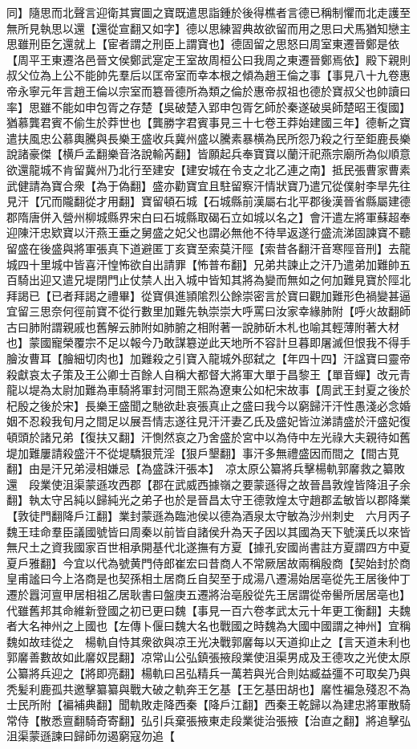 同】隨思而北聲言迎衛其實圖之寶既遣思詣鍾於後得樵者言德已稱制懼而北走護至無所見執思以還【還從宣翻又如字】德以思練習典故欲留而用之思曰犬馬猶知戀主思雖刑臣乞還就上【宦者謂之刑臣上謂寶也】德固留之思怒曰周室東遷晉鄭是依【周平王東遷洛邑晉文侯鄭武寔定王室故周桓公曰我周之東遷晉鄭焉依】殿下親則叔父位為上公不能帥先羣后以匡帝室而幸本根之傾為趙王倫之事【事見八十九卷惠帝永寧元年言趙王倫以宗室而簒晉德所為類之倫於惠帝叔祖也德於寶叔父也帥讀曰率】思雖不能如申包胥之存楚【吳破楚入郢申包胥乞師於秦遂破吳師楚昭王復國】猶慕龔君賓不偷生於莽世也【龔勝字君賓事見三十七卷王莽始建國三年】德斬之寶遣扶風忠公慕輿騰與長樂王盛收兵冀州盛以騰素暴横為民所怨乃殺之行至鉅鹿長樂說諸豪傑【横戶孟翻樂音洛說輸芮翻】皆願起兵奉寶寶以蘭汗祀燕宗廟所為似順意欲還龍城不肯留冀州乃北行至建安【建安城在令支之北乙連之南】抵民張曹家曹素武健請為寶合衆【為于偽翻】盛亦勸寶宜且駐留察汗情狀寶乃遣冗從僕射李旱先往見汗【冗而隴翻從才用翻】寶留頓石城【石城縣前漢屬右北平郡後漢晉省縣屬建德郡隋唐併入營州柳城縣界宋白曰石城縣取碣石立如城以名之】會汗遣左將軍蘇超奉迎陳汗忠欵寶以汗燕王垂之舅盛之妃父也謂必無他不待旱返遂行盛流涕固諫寶不聽留盛在後盛與將軍張真下道避匿丁亥寶至索莫汗陘【索昔各翻汗音寒陘音刑】去龍城四十里城中皆喜汗惶怖欲自出請罪【怖普布翻】兄弟共諫止之汗乃遣弟加難帥五百騎出迎又遣兄堤閉門止仗禁人出入城中皆知其將為變而無如之何加難見寶於陘北拜謁已【已者拜謁之禮畢】從寶俱進頴隂烈公餘崇密言於寶曰觀加難形色禍變甚逼宜留三思奈何徑前寶不從行數里加難先執崇崇大呼罵曰汝家幸緣肺附【呼火故翻師古曰肺附謂親戚也舊解云肺附如肺腑之相附著一說肺斫木札也喻其輕薄附著大材也】蒙國寵榮覆宗不足以報今乃敢謀簒逆此天地所不容計旦暮即屠滅但恨我不得手膾汝曹耳【膾細切肉也】加難殺之引寶入龍城外邸弑之【年四十四】汗諡寶曰靈帝殺獻哀太子策及王公卿士百餘人自稱大都督大將軍大單于昌黎王【單音蟬】改元青龍以堤為太尉加難為車騎將軍封河間王熙為遼東公如杞宋故事【周武王封夏之後於杞殷之後於宋】長樂王盛聞之馳欲赴哀張真止之盛曰我今以窮歸汗汗性愚淺必念婚姻不忍殺我旬月之間足以展吾情志遂往見汗汗妻乙氏及盛妃皆泣涕請盛於汗盛妃復頓頭於諸兄弟【復扶又翻】汗惻然哀之乃舍盛於宮中以為侍中左光祿大夫親待如舊堤加難屢請殺盛汗不從堤驕狠荒淫【狠戶墾翻】事汗多無禮盛因而間之【間古莧翻】由是汗兄弟浸相嫌忌【為盛誅汗張本】　凉太原公纂將兵擊楊軌郭黁救之纂敗還　段業使沮渠蒙遜攻西郡【郡在武威西據嶺之要蒙遜得之故晉昌敦煌皆降沮子余翻】執太守呂純以歸純光之弟子也於是晉昌太守王德敦煌太守趙郡孟敏皆以郡降業【敦徒門翻降戶江翻】業封蒙遜為臨池侯以德為酒泉太守敏為沙州刺史　六月丙子魏王珪命羣臣議國號皆曰周秦以前皆自諸侯升為天子因以其國為天下號漢氏以來皆無尺土之資我國家百世相承開基代北遂撫有方夏【據孔安國尚書註方夏謂四方中夏夏戶雅翻】今宜以代為號黄門侍郎崔宏曰昔商人不常厥居故兩稱殷商【契始封於商皇甫謐曰今上洛商是也契孫相土居商丘自契至于成湯八遷湯始居亳從先王居後仲丁遷於囂河亶甲居相祖乙居耿書曰盤庚五遷將治亳殷從先王居謂從帝嚳所居居亳也】代雖舊邦其命維新登國之初已更曰魏【事見一百六卷孝武太元十年更工衡翻】夫魏者大名神州之上國也【左傳卜偃曰魏大名也戰國之時魏為大國中國謂之神州】宜稱魏如故珪從之　楊軌自恃其衆欲與凉王光决戰郭黁每以天道抑止之【言天道未利也郭黁善數故如此黁奴昆翻】凉常山公弘鎮張掖段業使沮渠男成及王德攻之光使太原公纂將兵迎之【將即亮翻】楊軌曰呂弘精兵一萬若與光合則姑臧益彊不可取矣乃與秃髪利鹿孤共邀擊纂纂與戰大破之軌奔王乞基【王乞基田胡也】黁性褊急殘忍不為士民所附【褊補典翻】聞軌敗走降西秦【降戶江翻】西秦王乾歸以為建忠將軍散騎常侍【散悉亶翻騎奇寄翻】弘引兵棄張掖東走段業徙治張掖【治直之翻】將追擊弘沮渠蒙遜諫曰歸師勿遏窮寇勿追【